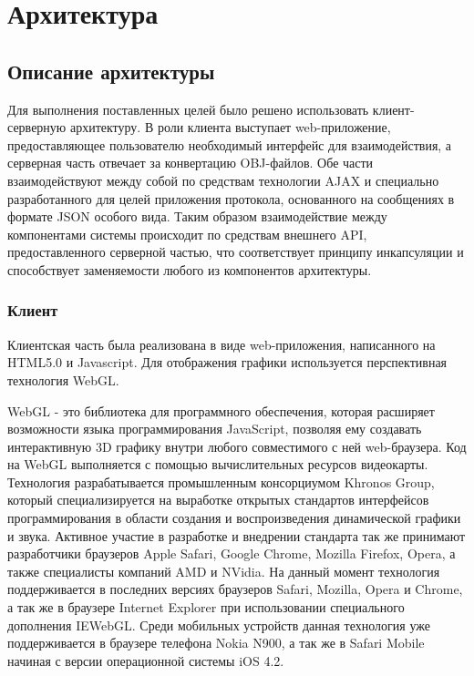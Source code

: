 \section{Архитектура}

\subsection{Описание архитектуры}

Для выполнения поставленных целей было решено использовать клиент-серверную
архитектуру. В роли клиента выступает web-приложение, предоставляющее
пользователю необходимый интерфейс для взаимодействия, а серверная часть
отвечает за конвертацию OBJ-файлов. Обе части
взаимодействуют между собой по средствам технологии AJAX и специально
разработанного для целей приложения протокола, основанного на сообщениях в
формате JSON особого вида. Таким образом взаимодействие между компонентами системы
происходит по средствам внешнего API, предоставленного серверной частью,
что соответствует принципу инкапсуляции и способствует заменяемости
любого из компонентов архитектуры.

\subsubsection{Клиент}

Клиентская часть была реализована в виде web-приложения, написанного
на HTML5.0 и Javascript. Для отображения графики используется
перспективная технология WebGL.

WebGL\cite{webgl} - это библиотека для программного обеспечения, которая расширяет
возможности языка программирования JavaScript, позволяя ему создавать
интерактивную 3D графику внутри любого совместимого с ней web-браузера. Код на
WebGL выполняется с помощью вычислительных ресурсов видеокарты. Технология
разрабатывается промышленным консорциумом Khronos Group, который
специализируется на выработке открытых стандартов интерфейсов программирования в
области создания и воспроизведения динамической графики и звука. Активное
участие в разработке и внедрении стандарта так же принимают разработчики
браузеров Apple Safari, Google Chrome, Mozilla Firefox, Opera,  а также
специалисты компаний AMD и NVidia. На данный момент технология поддерживается в
последних версиях браузеров Safari, Mozilla, Opera и Chrome, а так же в браузере
Internet Explorer при использовании специального дополнения IEWebGL. Среди
мобильных устройств данная технология уже поддерживается в браузере телефона
Nokia N900, а так же в Safari Mobile начиная с версии операционной системы iOS
4.2.

